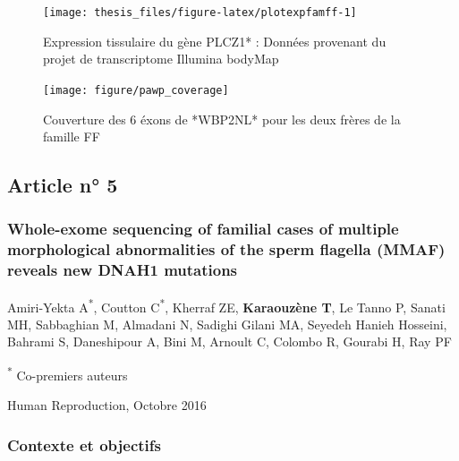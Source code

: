 \documentclass[12pt,twoside]{reedthesis}
\theoremstyle{definition}
\theoremstyle{definition}
\theoremstyle{remark}
\begin{document}
  \newpage
  
  \begin{figure}
  
  {\centering \texttt{[image: thesis\_files/figure-latex/plotexpfamff-1]} 
  
  }
  
  \caption[Expression tissulaire du gène PLCZ1*]{Expression tissulaire du gène PLCZ1* : Données provenant du projet de transcriptome Illumina bodyMap}\label{fig:plotexpfamff}
  \end{figure}
  
  \begin{figure}
  
  {\centering \texttt{[image: figure/pawp\_coverage]} 
  
  }
  
  \caption[Couverture des 6 éxons de *WBP2NL* pour les deux frères de la famille FF]{Couverture des 6 éxons de *WBP2NL* pour les deux frères de la famille FF}\label{fig:plotcovplcz}
  \end{figure}
  
  \newpage
  
  \subsection{Article n° 5}\label{article-n-5}
  
  \subsubsection{Whole-exome sequencing of familial cases of multiple
  morphological abnormalities of the sperm flagella (MMAF) reveals new
  DNAH1
  mutations}\label{whole-exome-sequencing-of-familial-cases-of-multiple-morphological-abnormalities-of-the-sperm-flagella-mmaf-reveals-new-dnah1-mutations}
  
  Amiri-Yekta A\textsuperscript{*}, Coutton C\textsuperscript{*}, Kherraf
  ZE, \textbf{Karaouzène T}, Le Tanno P, Sanati MH, Sabbaghian M, Almadani
  N, Sadighi Gilani MA, Seyedeh Hanieh Hosseini, Bahrami S, Daneshipour A,
  Bini M, Arnoult C, Colombo R, Gourabi H, Ray PF
  
  \textsuperscript{*} Co-premiers auteurs
  
  Human Reproduction, Octobre 2016
  
  \newpage
  
  \subsubsection{Contexte et objectifs}\label{contexte-et-objectifs-4}
  
\end{document}
